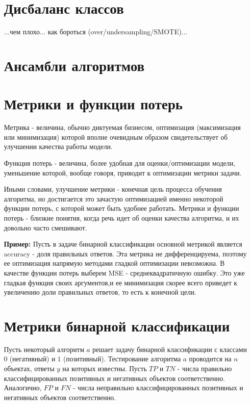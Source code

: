 \section{Дисбаланс классов}

...чем плохо... как бороться (over/undersampling/SMOTE)...


\section{Ансамбли алгоритмов}

\section{Метрики и функции потерь}

Метрика - величина, обычно диктуемая бизнесом, оптимизация (максимизация или минимизация) которой вполне очевидным образом свидетельствует об улучшении качества работы модели.

Функция потерь - величина, более удобная для оценки/оптимизации модели, уменьшение которой, вообще говоря, приводит к оптимизации метрики задачи.

Иными словами, улучшение метрики - конечная цель процесса обучения алгоритма, но достигается это зачастую оптимизацией именно некоторой функции потерь, с которой может быть удобнее работать.
Метрики и функции потерь - близкие понятия, когда речь идет об оценки качества алгоритма, и их довольно часто смешивают.

\textbf{Пример:} Пусть в задаче бинарной классификации основной метрикой является accuracy - доля правильных ответов. Эта метрика не дифференцируема, поэтому ее оптимизация напрямую методами гладкой оптимизации невозможна. В качестве функции потерь выберем MSE - среднеквадратичную ошибку. Это уже гладкая функция своих аргументов,и ее минимизация скорее всего приведет к увеличению доли правильных ответов, то есть к конечной цели. 

\section{Метрики бинарной классификации}

Пусть некоторый алгоритм $a$ решает задачу бинарной классификации с классами $0$ (негативный) и $1$ (позитивный).
Тестирование алгоритма $a$ проводится на $n$ объектах, ответы $y$ на которых известны. Пусть $TP$ и $TN$ - числа правильно классифицированных позитивных и негативных объектов соответственно. Аналогично, $FP$ и $FN$ - числа неправильно классифицированных позитивных и негативных объектов соответственно.

